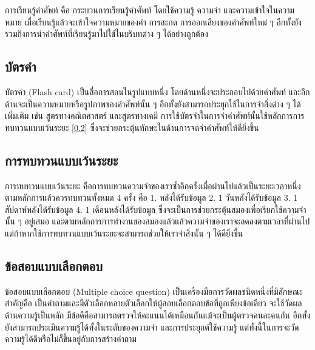 \documentclass[12pt,oneside,openright,a4paper]{cpe-thai-project}
\begin{document}
\hspace{1cm}
การเรียนรู้คำศัพท์ คือ กระบวนการเรียนรู้คำศัพท์ โดยใช้ความรู้ ความจำ และความเข้าใจในความหมาย เมื่อเรียนรู้แล้วจะเข้าใจความหมายของคำ
การสะกด การออกเสียงของคำศัพท์ใหม่ ๆ อีกทั้งยังรวมถึงการนำคำศัพท์ที่เรียนรู้มาไปใช้ในบริบทต่าง ๆ ได้อย่างถูกต้อง

\subsection{บัตรคำ \cite{Flashcard}}

\hspace{1cm}
บัตรคำ (Flash card) เป็นสื่อการสอนในรูปแบบหนึ่ง โดยด้านหนึ่งจะประกอบไปด้วยคำศัพท์
และอีกด้านจะเป็นความหมายหรือรูปภาพของคำศัพท์นั้น ๆ อีกทั้งยังสามารถประยุกใช้ในการจำสิ่งต่าง ๆ ได้เพิ่มเติม เช่น
สูตรทางคณิตศาสตร์ และสูตรทางเคมี การใช้บัตรจำในการจำคำศัพท์นั้นใช้หลักการการทบทวนแบบเว้นระยะ [\ref{ssec:SpacedRepetition}]
ซึ่งจะช่วยกระตุ้นทักษะในด้านการจดจำคำศัพท์ให้ดียิ่งขึ้น

\subsection{การทบทวนแบบเว้นระยะ \cite{SpacedRepetition}}\label{ssec:SpacedRepetition}

\hspace{1cm}
การทบทวนแบบเว้นระยะ คือการทบทวนความจำของเราซ้ำอีกครั้งเมื่อผ่านไปแล้วเป็นระยะเวลาหนึ่ง ตามหลักการแล้วควรทบทวนทั้งหมด 4 ครั้ง คือ
1. หลังได้รับข้อมูล 2. 1 วันหลังได้รับข้อมูล 3. 1 สัปดาห์หลังได้รับข้อมูล 4. 1 เดือนหลังได้รับข้อมูล
ซึ่งจะเป็นการช่วยกระตุ้นสมองเพื่อเรียกใช้ความจำนั้น ๆ อยู่เสมอ และตามหลักการการทำงานของสมองแล้วแล้วความจำของเราจะลดลงตามเวลาที่ผ่านไป 
แต่ถ้าหากใช้การทบทวนแบบเว้นระยะจะสามารถช่วยให้เราจำสิ่งนั้น ๆ ได้ดียิ่งขึ้น

\subsection{ข้อสอบแบบเลือกตอบ \cite{MultiChoices}}

\hspace{1cm}
ข้อสอบแบบเลือกตอบ (Multiple choice question) เป็นเครื่องมือการวัดผลชนิดหนึ่งที่มีลักษณะสำคัญคือ
เป็นคำถามและมีตัวเลือกหลายตัวเลือกให้ผู้สอบเลือกตอบข้อที่ถูกเพียงข้อเดียว จะใช้วัดผลด้านความรู้เป็นหลัก
มีข้อดีคือสามารถตรวจให้คะแนนได้เหมือนกันแม้จะเป็นผู้ตรวจคนละคนกัน อีกทั้งยังสามารถประเมินความรู้ได้ทั้งในระดับของความจำ
และการประยุกต์ใช้ความรู้ แต่ทั้งนี้ในการจะวัดความรู้ได้ดีหรือไม่ก็ขึ้นอยู่กับการสร้างคำถาม
\end{document}
